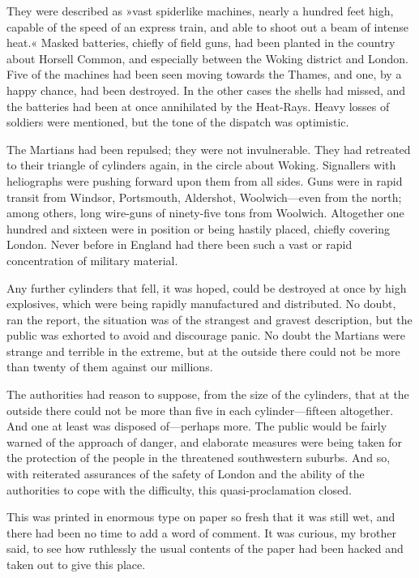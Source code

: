 They were described as »vast spiderlike machines, nearly a hundred feet high, capable of the speed of an express train, and able to shoot out a beam of intense heat.« Masked batteries, chiefly of field guns, had been planted in the country about Horsell Common, and especially between the Woking district and London. Five of the machines had been seen moving towards the Thames, and one, by a happy chance, had been destroyed. In the other cases the shells had missed, and the batteries had been at once annihilated by the Heat-Rays. Heavy losses of soldiers were mentioned, but the tone of the dispatch was optimistic.

The Martians had been repulsed; they were not invulnerable. They had retreated to their triangle of cylinders again, in the circle about Woking. Signallers with heliographs were pushing forward upon them from all sides. Guns were in rapid transit from Windsor, Portsmouth, Aldershot, Woolwich—even from the north; among others, long wire-guns of ninety-five tons from Woolwich. Altogether one hundred and sixteen were in position or being hastily placed, chiefly covering London. Never before in England had there been such a vast or rapid concentration of military material.

Any further cylinders that fell, it was hoped, could be destroyed at once by high explosives, which were being rapidly manufactured and distributed. No doubt, ran the report, the situation was of the strangest and gravest description, but the public was exhorted to avoid and discourage panic. No doubt the Martians were strange and terrible in the extreme, but at the outside there could not be more than twenty of them against our millions.

The authorities had reason to suppose, from the size of the cylinders, that at the outside there could not be more than five in each cylinder—fifteen altogether. And one at least was disposed of—perhaps more. The public would be fairly warned of the approach of danger, and elaborate measures were being taken for the protection of the people in the threatened southwestern suburbs. And so, with reiterated assurances of the safety of London and the ability of the authorities to cope with the difficulty, this quasi-proclamation closed.

This was printed in enormous type on paper so fresh that it was still wet, and there had been no time to add a word of comment. It was curious, my brother said, to see how ruthlessly the usual contents of the paper had been hacked and taken out to give this place.

